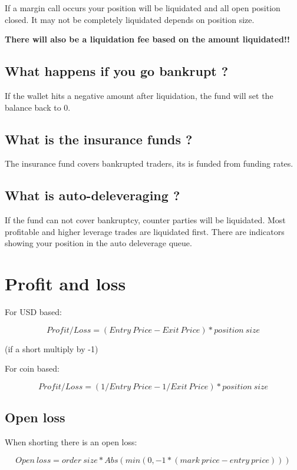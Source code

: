 \documentclass[11pt]{scrartcl} %
\begin{document}
If a margin call occurs your position will be liquidated and all open position closed. It may not be
completely liquidated depends on position size.

\textbf{There will also be a liquidation fee based on the amount liquidated!!}

\subsection{What happens if you go bankrupt ?}

If the wallet hits a negative amount after liquidation, the fund will set the balance back to 0.

\subsection{What is the insurance funds ?}

The insurance fund covers bankrupted traders, its is funded from funding rates.

\subsection{What is auto-deleveraging ?}

If the fund can not cover bankruptcy, counter parties will be liquidated. Most profitable and higher
leverage trades are liquidated first. There are indicators showing your position in the auto deleverage
queue.

\section{Profit and loss}

For USD based:

\[ Profit/Loss = (Entry\:Price - Exit\:Price)* position\:size \]

(if a short multiply by -1)

For coin based:

\[ Profit/Loss = (1/Entry\:Price - 1/Exit\:Price) * position\:size \]

\subsection{Open loss}

When shorting there is an open loss:

\[ Open\:loss = order\:size * Abs(min(0,-1*(mark\:price - entry\:price)))\]
\end{document}
